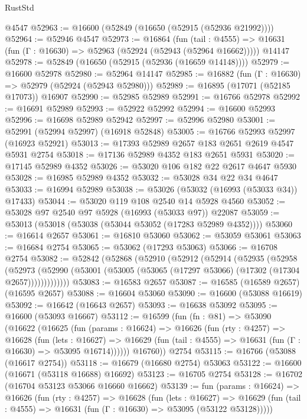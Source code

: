 \begin{lexlean}{RustStd}
\begin{coremodule}
{\begin{coremodule}
{{{{{{{{{{{{{{{{{{{{{{{{{{{{{{{{{{{{{{{{{{{{{{{{{{{{{{{    @4547
@52963 := @16600 (@52849 (@16650 (@52915 (@52936 @21992))))
@52964 := @52946 @4547
@52973 := @16864
    (fun (tail : @4555) => @16631 (fun (Γ : @16630) => @52963 (@52924 (@52943 (@52964 @16662)))))
    @14147
@52978 := @52849 (@16650 (@52915 (@52936 (@16659 @14148))))
@52979 := @16600 @52978
@52980 := @52964 @14147
@52985 := @16882 (fun (Γ : @16630) => @52979 (@52924 (@52943 @52980)))
@52989 := @16895 (@17071 (@52185 @17073)) @16907
@52990 := @52985 @52989
@52991 := @16766 @52978
@52992 := @16691 @52989
@52993 := @52922 @52992
@52994 := @16600 @52993
@52996 := @16698 @52989 @52942
@52997 := @52996 @52980
@53001 := @52991 (@52994 @52997) (@16918 @52848)
@53005 := @16766 @52993 @52997 (@16923 @52921)
@53013 := @17393 @52989 @2657 @183 @2651 @2619 @4547 @5931 @2754
@53018 := @17136 @52989 @4352 @183 @2651 @5931
@53020 := @17145 @52989 @4352
@53026 := @53020 @106 @182 @22 @2617 @4647 @5930
@53028 := @16985 @52989 @4352
@53032 := @53028 @34 @22 @34 @4647
@53033 := @16994 @52989
@53038 := @53026 (@53032 (@16993 (@53033 @34)) @17433)
@53044 := @53020 @119 @108 @2540 @14 @5928 @4560
@53052 := @53028 @97 @2540 @97 @5928 (@16993 (@53033 @97)) @22087
@53059 := @53013 (@53018 (@53038 (@53044 @53052 (@17283 @52989 @4352))))
@53060 := @16614 @2657
@53061 := @16810 @53060
@53062 := @53059 @53061
@53063 := @16684 @2754
@53065 := @53062 (@17293 @53063)
@53066 := @16708 @2754
@53082 := @52842
    (@52868
      (@52910
        (@52912
          (@52914
            (@52935
              (@52958
                (@52973
                  (@52990 (@53001 (@53005 (@53065 (@17297 @53066) (@17302 (@17304 @2657)))))))))))))
@53083 := @16583 @2657
@53087 := @16585 (@16589 @2657) (@16595 @2657)
@53088 := @16604 @53060
@53090 := @16600 (@53088 @16619)
@53092 := @16642 (@16643 @2657)
@53093 := @16638 @53092
@53095 := @16600 (@53093 @16667)
@53112 := @16599
    (fun (fn : @81) =>
    @53090
      (@16622
        (@16625
          (fun (params : @16624) =>
          @16626
            (fun (rty : @4257) =>
            @16628
              (fun (lets : @16627) =>
              @16629 (fun (tail : @4555) => @16631 (fun (Γ : @16630) => @53095 @16714))))))
        @16760))
    @2754
@53115 := @16766 (@53088 (@16617 @2754))
@53118 := @16679 (@16680 @2754) @53063
@53122 := @16600 (@16671 (@53118 @16688) @16692)
@53123 := @16705 @2754
@53128 := @16702 (@16704 @53123 @53066 @16660 @16662)
@53139 := fun (params : @16624) =>
  @16626
    (fun (rty : @4257) =>
    @16628
      (fun (lets : @16627) =>
      @16629 (fun (tail : @4555) => @16631 (fun (Γ : @16630) => @53095 (@53122 @53128)))))
}}}}}}}}}}}}}}}}}}}}}}}}}}}}}}}}}}}}}}}}}}}}}}}}}}}}}}}
\end{coremodule}}
\end{coremodule}
\end{lexlean}
